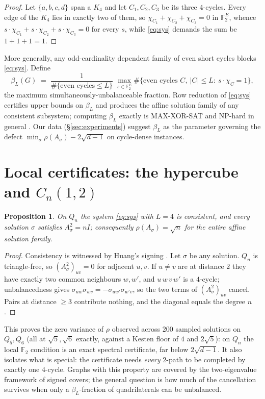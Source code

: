 \documentclass[11pt]{article}
\newtheorem{proposition}[lemma]{Proposition}
\theoremstyle{remark}
\newcommand{\F}{\mathbb{F}}
\newcommand{\rhomax}{\rho}
\begin{document}
\begin{proof}
Let $\{a,b,c,d\}$ span a $K_4$ and let $C_1,C_2,C_3$ be its three
$4$-cycles. Every edge of the $K_4$ lies in exactly two of them, so
$\chi_{C_1}+\chi_{C_2}+\chi_{C_3}=0$ in $\F_2^E$, whence
$s\cdot\chi_{C_1}+s\cdot\chi_{C_2}+s\cdot\chi_{C_3}=0$ for every $s$,
while \eqref{eq:sys} demands the sum be $1+1+1=1$.
\end{proof}

More generally, any odd-cardinality dependent family of even short
cycles blocks \eqref{eq:sys}. Define
\[
\beta_L(G)\;=\;\frac{1}{\#\{\text{even cycles}\le L\}}\;
\max_{s\in\F_2^E}\#\{\text{even cycles }C,\ |C|\le L:\ s\cdot\chi_C=1\},
\]
the maximum simultaneously-unbalanceable fraction. Row reduction of
\eqref{eq:sys} certifies upper bounds on $\beta_L$ and produces the
affine solution family of any consistent subsystem; computing $\beta_L$
exactly is MAX-XOR-SAT and NP-hard in general \cite{hastad01}. Our data
(\S\ref{sec:experiments}) suggest $\beta_L$ as the parameter governing
the defect $\min_\sigma\rhomax(A_\sigma)-2\sqrt{d-1}$ on cycle-dense
instances.

\section{Local certificates: the hypercube and $C_n(1,2)$}

\begin{proposition}\label{prop:cube}
On $Q_n$ the system \eqref{eq:sys} with $L=4$ is consistent, and
\emph{every} solution $\sigma$ satisfies $A_\sigma^2=nI$; consequently
$\rhomax(A_\sigma)=\sqrt n$ for the entire affine solution family.
\end{proposition}

\begin{proof}
Consistency is witnessed by Huang's signing \cite{huang19}. Let $\sigma$
be any solution. $Q_n$ is triangle-free, so
$(A_\sigma^2)_{uv}=0$ for adjacent $u,v$. If $u\ne v$ are at distance
$2$ they have exactly two common neighbours $w,w'$, and
$u\,w\,v\,w'$ is a $4$-cycle; unbalancedness gives
$\sigma_{uw}\sigma_{wv}=-\sigma_{uw'}\sigma_{w'v}$, so the two terms of
$(A_\sigma^2)_{uv}$ cancel. Pairs at distance $\ge3$ contribute nothing,
and the diagonal equals the degree $n$.
\end{proof}

This proves the zero variance of $\rhomax$ observed across $200$ sampled
solutions on $Q_5,Q_6$ (all at $\sqrt5,\sqrt6$ exactly, against a Kesten
floor of $4$ and $2\sqrt5$): on $Q_n$ the local $\F_2$ condition is an
exact spectral certificate, far below $2\sqrt{d-1}$. It also isolates
what is special: the certificate needs \emph{every} $2$-path to be
completed by exactly one $4$-cycle. Graphs with this property are
covered by the two-eigenvalue framework of signed covers; the general
question is how much of the cancellation survives when only a
$\beta_L$-fraction of quadrilaterals can be unbalanced.
\end{document}
